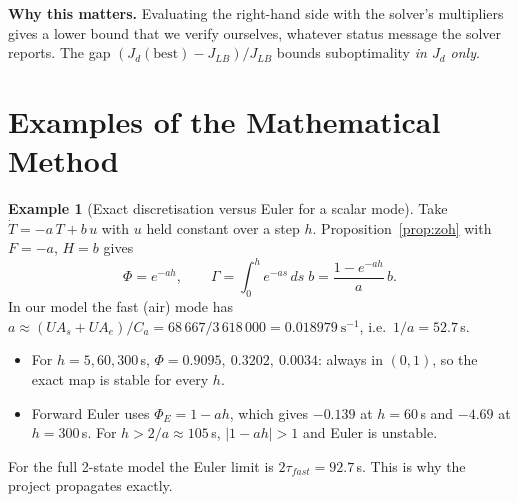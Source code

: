 \documentclass[12pt,a4paper]{report}
\theoremstyle{definition}
\newtheorem{example}{Example}[chapter]
\begin{document}
\noindent \textbf{Why this matters.} Evaluating the right-hand side with the solver's multipliers gives a lower bound that we verify ourselves, whatever status message the solver reports. The gap $(J_d(\text{best})-J_{LB})/J_{LB}$ bounds suboptimality \emph{in $J_d$ only}.

\section{Examples of the Mathematical Method}

\begin{example}[Exact discretisation versus Euler for a scalar mode]\label{ex:zoh}
Take $\dot T=-a\,T+b\,u$ with $u$ held constant over a step $h$. Proposition~\ref{prop:zoh} with $F=-a$, $H=b$ gives
\[
\Phi=e^{-ah},\qquad \Gamma=\int_0^h e^{-as}\,ds\;b=\frac{1-e^{-ah}}{a}\,b .
\]
In our model the fast (air) mode has $a\approx(UA_s+UA_e)/C_a=68\,667/3\,618\,000=0.018979\ \mathrm{s^{-1}}$, i.e.\ $1/a=52.7$\,s.
\begin{itemize}
\item For $h=5,60,300$\,s, $\Phi=0.9095,\ 0.3202,\ 0.0034$: always in $(0,1)$, so the exact map is stable for every $h$.
\item Forward Euler uses $\Phi_E=1-ah$, which gives $-0.139$ at $h=60$\,s and $-4.69$ at $h=300$\,s. For $h>2/a\approx105$\,s, $|1-ah|>1$ and Euler is unstable.
\end{itemize}
For the full 2-state model the Euler limit is $2\tau_{fast}=92.7$\,s. This is why the project propagates exactly.
\end{example}
\end{document}
